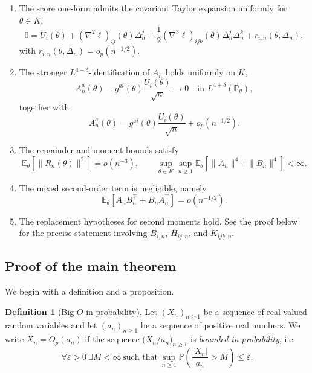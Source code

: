 \documentclass[11pt,letterpaper]{amsart}
\newcommand{\E}{\mathbb{E}}
\renewcommand{\P}{\mathbb{P}}
\numberwithin{equation}{section}
\theoremstyle{plain}
\theoremstyle{definition}
\newtheorem{definition}[theorem]{Definition}
\theoremstyle{remark}
\begin{document}
\begin{enumerate}
\item The score one-form admits the covariant Taylor expansion uniformly for \(\theta\in K\),
\[
0=U_i(\theta)+(\nabla^2\ell)_{ij}(\theta)\Delta_n^j+\frac12(\nabla^3\ell)_{ijk}(\theta)\Delta_n^j\Delta_n^k+r_{i,n}(\theta,\Delta_n),
\]
with \(r_{i,n}(\theta,\Delta_n)=o_p(n^{-1/2})\).

\item The stronger \(L^{4+\delta}\)-identification of \(A_n\) holds uniformly on \(K\),
\[
A_n^a(\theta)-g^{ai}(\theta)\frac{U_i(\theta)}{\sqrt n}\longrightarrow 0 \quad\text{in }L^{4+\delta}(\P_\theta),
\]
together with
\[
A_n^a(\theta)=g^{ai}(\theta)\frac{U_i(\theta)}{\sqrt n}+o_p(n^{-1/2}).
\]

\item The remainder and moment bounds satisfy
\[
\E_\theta[\|R_n(\theta)\|^2]=o(n^{-3}),
\qquad
\sup_{\theta\in K}\sup_{n\ge1}\E_\theta[\|A_n\|^4+\|B_n\|^4]<\infty.
\]

\item The mixed second-order term is negligible, namely
\[
\E_\theta[A_nB_n^\top+B_nA_n^\top]=o(n^{-1/2}).
\]

\item The replacement hypotheses for second moments hold. See the proof below for the precise statement involving \(B_{i,n}\), \(H_{ij,n}\), and \(K_{ijk,n}\).
\end{enumerate}

\subsection{Proof of the main theorem}
\label{app:proof_main}

We begin with a definition and a proposition. 
\begin{definition}[Big-$O$ in probability]\label{bigO_in_p}
Let $(X_n)_{n\ge1}$ be a sequence of real-valued random variables and let $(a_n)_{n\ge1}$ be a sequence of positive real numbers.  
We write $X_n = O_p(a_n)$ if the sequence $\bigl(X_n/a_n\bigr)_{n\ge1}$ is \emph{bounded in probability}, i.e.
\[
\forall \varepsilon>0\ \exists M<\infty \ \text{such that}\ \sup_{n\ge1}\mathbb{P}\!\left(\frac{|X_n|}{a_n}>M\right)\le \varepsilon .
\]
\end{definition}
\end{document}
